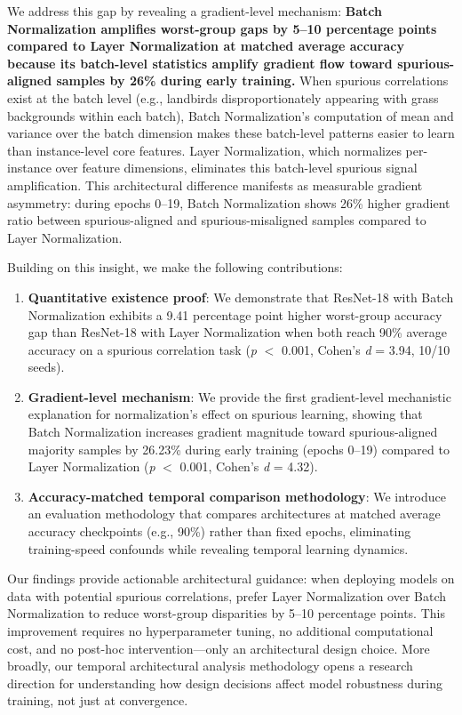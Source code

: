 We address this gap by revealing a gradient-level mechanism: \textbf{Batch Normalization amplifies worst-group gaps by 5--10 percentage points compared to Layer Normalization at matched average accuracy because its batch-level statistics amplify gradient flow toward spurious-aligned samples by 26\% during early training.} When spurious correlations exist at the batch level (e.g., landbirds disproportionately appearing with grass backgrounds within each batch), Batch Normalization's computation of mean and variance over the batch dimension makes these batch-level patterns easier to learn than instance-level core features. Layer Normalization, which normalizes per-instance over feature dimensions, eliminates this batch-level spurious signal amplification. This architectural difference manifests as measurable gradient asymmetry: during epochs 0--19, Batch Normalization shows 26\% higher gradient ratio between spurious-aligned and spurious-misaligned samples compared to Layer Normalization.

Building on this insight, we make the following contributions:

\begin{enumerate}
\item \textbf{Quantitative existence proof}: We demonstrate that ResNet-18 with Batch Normalization exhibits a 9.41 percentage point higher worst-group accuracy gap than ResNet-18 with Layer Normalization when both reach 90\% average accuracy on a spurious correlation task (\emph{p} $<$ 0.001, Cohen's \emph{d} = 3.94, 10/10 seeds).

\item \textbf{Gradient-level mechanism}: We provide the first gradient-level mechanistic explanation for normalization's effect on spurious learning, showing that Batch Normalization increases gradient magnitude toward spurious-aligned majority samples by 26.23\% during early training (epochs 0--19) compared to Layer Normalization (\emph{p} $<$ 0.001, Cohen's \emph{d} = 4.32).

\item \textbf{Accuracy-matched temporal comparison methodology}: We introduce an evaluation methodology that compares architectures at matched average accuracy checkpoints (e.g., 90\%) rather than fixed epochs, eliminating training-speed confounds while revealing temporal learning dynamics.
\end{enumerate}

Our findings provide actionable architectural guidance: when deploying models on data with potential spurious correlations, prefer Layer Normalization over Batch Normalization to reduce worst-group disparities by 5--10 percentage points. This improvement requires no hyperparameter tuning, no additional computational cost, and no post-hoc intervention---only an architectural design choice. More broadly, our temporal architectural analysis methodology opens a research direction for understanding how design decisions affect model robustness during training, not just at convergence.

